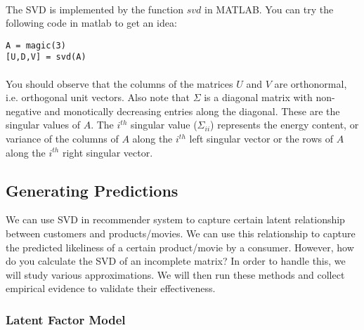 \documentclass{article}
\begin{document}
\paragraph{}
The SVD is implemented by the function $svd$ in MATLAB. You can try the following code in matlab to get an idea:
\begin{verbatim}
A = magic(3)
[U,D,V] = svd(A)
\end{verbatim}
\paragraph{}
You should observe that the columns of the matrices $U$ and $V$ are orthonormal, i.e. orthogonal unit vectors. Also note that $\Sigma$ is a diagonal matrix with non-negative and monotically decreasing entries along the diagonal. These are the singular values of $A$. The $i^{th}$ singular value ($\Sigma_{ii}$) represents the energy content, or variance of the columns of $A$ along the $i^{th}$ left singular vector or the rows of $A$ along the $i^{th}$ right singular vector.
  \subsection{Generating Predictions}
  We can use SVD in recommender system to capture certain latent relationship between customers and products/movies. We can use this relationship to capture the predicted likeliness of a certain product/movie by a consumer. However, how do you calculate the SVD of an incomplete matrix? In order to handle this, we will study various approximations. We will then run these methods and collect empirical evidence to validate their effectiveness.
  \subsubsection{Latent Factor Model}
\end{document}
